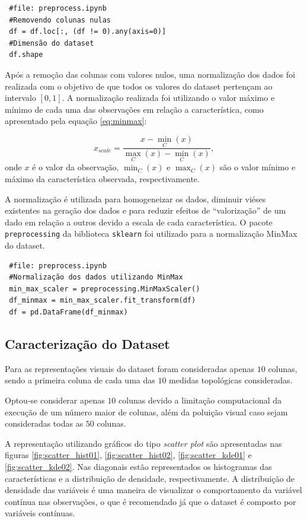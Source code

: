 \documentclass[
	article,			%
	11pt,				%
	oneside,			%
	a4paper,			%
	english,			%
	brazil,				%
	sumario=tradicional
	]{abntex2}
\begin{document}
\begin{verbatim}
 #file: preprocess.ipynb
 #Removendo colunas nulas
 df = df.loc[:, (df != 0).any(axis=0)]
 #Dimensão do dataset
 df.shape
\end{verbatim}

Após a remoção das colunas com valores nulos, uma normalização dos dados foi realizada com o objetivo de que todos os valores do dataset pertençam ao intervalo $[0,1]$. A normalização realizada foi utilizando o valor máximo e mínimo de cada uma das observações em relação a característica, como apresentado pela equação \ref{eq:minmax}:

\begin{equation}
\label{eq:minmax}
 x_{scale} = \frac{x - \min_{C}{(x)}}{\max_{C}{(x)}-\min_{C}{(x)}},
\end{equation}
onde $x$ é o valor da observação, $\min_{C}{(x)}$ e $\max_{C}{(x)}$ são o valor mínimo e máximo da característica observada, respectivamente.

A normalização é utilizada para homogeneizar os dados, diminuir viéses existentes na geração dos dados e para reduzir efeitos de ``valorização'' de um dado em relação a outros devido a escala de cada característica. O pacote \verb|preprocessing| da biblioteca \verb|sklearn| foi utilizado para a normalização MinMax do dataset.

\begin{verbatim}
 #file: preprocess.ipynb
 #Normalização dos dados utilizando MinMax
 min_max_scaler = preprocessing.MinMaxScaler()
 df_minmax = min_max_scaler.fit_transform(df)
 df = pd.DataFrame(df_minmax)
\end{verbatim}


\subsection{Caracterização do Dataset}

Para as representações visuais do dataset foram consideradas apenas $10$ colunas, sendo a primeira coluna de cada uma das $10$ medidas topológicas consideradas.

Optou-se considerar apenas $10$ colunas devido a limitação computacional da execução de um número maior de colunas, além da poluição visual caso sejam consideradas todas as $50$ colunas.

A representação utilizando gráficos do tipo \textit{scatter plot} são apresentadas nas figuras \ref{fig:scatter_hist01}, \ref{fig:scatter_hist02}, \ref{fig:scatter_kde01} e \ref{fig:scatter_kde02}. Nas diagonais estão representados os histogramas das características e a distribuição de densidade, respectivamente. A distribuição de densidade das variáveis é uma maneira de visualizar o comportamento da variável contínua nas observações, o que é recomendado já que o dataset é composto por variáveis contínuas.
\end{document}

